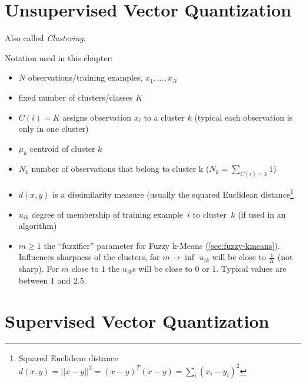 \chapter{Unsupervised Vector Quantization}\label{chapter:clustering}
Also called \emph{Clustering}.

Notation used in this chapter:
\begin{itemize}
    \item $N$ observations/training examples, $x_1, \dots, x_N$
    \item fixed number of clusters/classes $K$
    \item $C(i) = K$ assigns observation $x_i$ to a cluster $k$ (typical each observation is only in one cluster)
    \item $\mu_k$ centroid of cluster $k$
    \item $N_k$ number of observations that belong to cluster k ($N_k = \sum\limits_{C(i)=k} 1$)
    \item $d(x, y)$ is a dissimilarity measure (usually the squared Euclidean distance\footnote{Squared Euclidean distance $d(x, y) = ||x-y||^2 = (x-y)^T (x-y) = \sum_i (x_i-y_i)^2$}
    \item $u_{ik}$ degree of membership of training example~$i$ to cluster~$k$ (if used in an algorithm)
    \item $m \geq 1$ the \enquote{fuzzifier} parameter for Fuzzy k-Means (\cref{sec:fuzzy-kmeans}). Influences sharpness of the clusters, for $m \to \inf$ $u_{ik}$ will be close to $\frac{1}{K}$ (not sharp). For $m$ close to $1$ the $u_{ik}$s will be close to $0$ or $1$. Typical values are between $1$ and $2.5$.
\end{itemize}







\chapter{Supervised Vector Quantization}\label{chapter:lvq}




